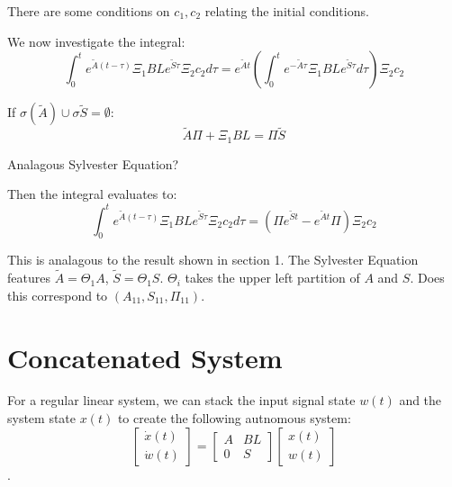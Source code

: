 \documentclass{article}
\begin{document}
There are some conditions on $c_1, c_2$ relating the initial conditions. 

We now investigate the integral: 
\begin{equation}
    \int_{0}^{t} e^{\tilde{A} (t-\tau)} \Xi_1 BL e^{\tilde{S} \tau} \Xi_2 c_2 d \tau = e^{\tilde{A}t} \left( \int_{0}^{t} e^{-\tilde{A}\tau} \Xi_1 BL e^{\tilde{S} \tau} d \tau \right) \Xi_2 c_2
\end{equation}

If $\sigma(\tilde{A}) \cup \sigma{\tilde{S}} = \emptyset$:
\begin{equation}
    \tilde{A} \Pi + \Xi_1 BL = \Pi \tilde{S}
\end{equation}

Analagous Sylvester Equation?

Then the integral evaluates to:
\begin{equation}
    \int_{0}^{t} e^{\tilde{A} (t-\tau)} \Xi_1 BL e^{\tilde{S} \tau} \Xi_2 c_2 d \tau = \left( \Pi e^{\tilde{S} t} - e^{\tilde{A} t} \Pi \right) \Xi_2 c_2
\end{equation}


This is analagous to the result shown in section 1. 
\newline
The Sylvester Equation features $\tilde{A} = \Theta_1 A$, $\tilde{S} = \Theta_1 S$.
$\Theta_i$ takes the upper left partition of $A$ and $S$. 
Does this correspond to $\left( A_{11}, S_{11}, \Pi_{11} \right) $. 

\section{Concatenated System}
For a regular linear system, we can stack the input signal state $w(t)$ and the system state $x(t)$ to create the following autnomous system:
\begin{equation}
    \begin{bmatrix}
        \dot{x}(t) \\
        \dot{w}(t)
    \end{bmatrix}
    = 
    \begin{bmatrix}
        A & BL \\ 
        0 & S 
    \end{bmatrix}
    \begin{bmatrix}
        x(t) \\ 
        w(t)
    \end{bmatrix}
\end{equation}. 
\end{document}
